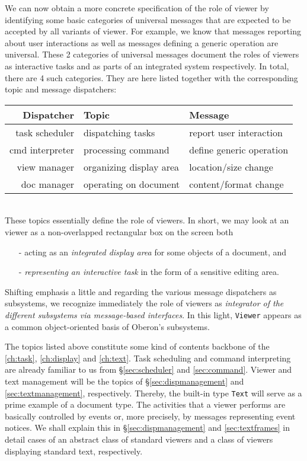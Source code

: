 We can now obtain a more concrete specification of the role of viewer
by identifying some basic categories of universal messages
that are expected to be accepted by all variants of viewer.
For example, we know that messages reporting about user interactions
as well as messages defining a generic operation are universal.
These 2 categories of universal messages document the roles of viewers as interactive tasks
and as parts of an integrated system respectively.
In total, there are 4 such categories.
They are here listed together with the corresponding topic and message dispatchers:
\begin{table}[h!]
  \setlength{\tabcolsep}{3pt}
  \begin{tabular}{r|l|l}
    Dispatcher               &Topic
                             &Message \\\hline
    {\small  task scheduler} &{\small dispatching tasks}
                             &{\small report user interaction }\\
    {\small cmd interpreter} &{\small processing command}
                             &{\small define generic operation}\\
    {\small    view manager} &{\small organizing display area}
                             &{\small location/size change}\\
    {\small     doc manager} &{\small operating on document}
                             &{\small content/format change}
  \end{tabular}
\end{table}
\\These topics essentially define the role of viewers.
In short, we may look at an viewer as a non-overlapped rectangular box on the screen both
\begin{itemize}
  \item[-] acting as an \emph{integrated display area} for some objects of a document, and
  \item[-] \emph{representing an interactive task} in the form of a sensitive editing area.
\end{itemize}

Shifting emphasis a little and regarding the various message dispatchers as subsystems,
we recognize immediately the role of viewers as \emph{integrator of the different subsystems
via message-based interfaces}.  In this light,
\verb|Viewer| appears as a common object-oriented basis of Oberon's subsystems.

The topics listed above constitute some kind of contents backbone of the \ref{ch:task},
\ref{ch:display} and \ref{ch:text}.  Task scheduling and command interpreting
are already familiar to us from \S \ref{sec:scheduler} and \ref{sec:command}.
Viewer and text management will be the topics of \S \ref{sec:dispmanagement}
and \ref{sec:textmanagement}, respectively.  Thereby, the built-in type \verb|Text|
will serve as a prime example of a document type.  The activities that a viewer performs
are basically controlled by events or, more precisely, by messages representing event notices.
We shall explain this in \S \ref{sec:dispmanagement} and \ref{sec:textframes}
in detail cases of an abstract class of standard viewers and
a class of viewers displaying standard text, respectively.

